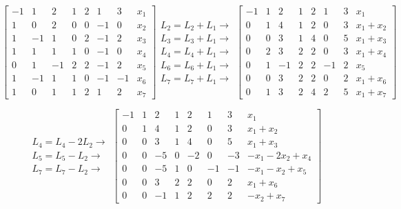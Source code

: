 \documentclass[11pt]{article}
\newenvironment{question}[1]
  {\par\addvspace{\medskipamount}
   \noindent\makebox[0pt][r]{\textbf{#1)} }\ignorespaces}
  {\par\addvspace{\medskipamount}}
\begin{document}
\begin{question}{4}
\begin{footnotesize}
$$
\left[\begin{array}{rrrrrrr|l}
    -1 & 1 & 2 & 1 & 2 & 1 & 3 & x_1\\
    1 & 0 & 2 & 0 & 0 & -1 & 0 & x_2\\
    1 & -1 & 1 & 0 & 2 & -1 & 2 & x_3\\
    1 & 1 & 1 & 1 & 0 & -1 & 0 & x_4\\
    0 & 1 & -1 & 2 & 2 & -1 & 2 & x_5\\
    1 & -1 & 1 & 1 & 0 & -1 & -1 & x_6\\
    1 & 0 & 1 & 1 & 2 & 1 & 2 & x_7
\end{array}\right]
\substack{
  \mbox{$L_2=L_2+L_1 \rightarrow$}\\[.5em]
  \mbox{$L_3=L_3+L_1 \rightarrow$}\\[.5em]
  \mbox{$L_4=L_4+L_1 \rightarrow$}\\[.5em]
  \mbox{$L_6=L_6+L_1 \rightarrow$}\\[.5em]
  \mbox{$L_7=L_7+L_1 \rightarrow$}
}
\left[\begin{array}{rrrrrrr|l}
    -1 & 1 & 2 & 1 & 2 & 1 & 3 & x_1\\
    0 & 1 & 4 & 1 & 2 & 0 & 3 & x_1 + x_2\\
    0 & 0 & 3 & 1 & 4 & 0 & 5 & x_1 + x_3\\
    0 & 2 & 3 & 2 & 2 & 0 & 3 & x_1 + x_4\\
    0 & 1 & -1 & 2 & 2 & -1 & 2 & x_5\\
    0 & 0 & 3 & 2 & 2 & 0 & 2 & x_1 + x_6\\
    0 & 1 & 3 & 2 & 4 & 2 & 5 & x_1 + x_7
\end{array}\right]
$$
\end{footnotesize}
$$
\substack{
  \mbox{$L_4=L_4-2L_2 \rightarrow$}\\[.5em]
  \mbox{$L_5=L_5-L_2 \rightarrow$}\\[.5em]
  \mbox{$L_7=L_7-L_2 \rightarrow$}
}
\left[\begin{array}{rrrrrrr|l}
    -1 & 1 & 2 & 1 & 2 & 1 & 3 & x_1\\
    0 & 1 & 4 & 1 & 2 & 0 & 3 & x_1 + x_2\\
    0 & 0 & 3 & 1 & 4 & 0 & 5 & x_1 + x_3\\
    0 & 0 & -5 & 0 & -2 & 0 & -3 & - x_1 - 2 x_2 + x_4\\
    0 & 0 & -5 & 1 & 0 & -1 & -1 & - x_1 - x_2 + x_5\\
    0 & 0 & 3 & 2 & 2 & 0 & 2 & x_1 + x_6\\
    0 & 0 & -1 & 1 & 2 & 2 & 2 & - x_2 + x_7
\end{array}\right]
$$


\end{question}
\end{document}
